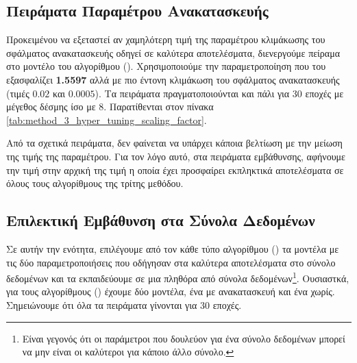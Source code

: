\subsection{Πειράματα Παραμέτρου Ανακατασκευής}

Προκειμένου να εξεταστεί αν χαμηλότερη τιμή της παραμέτρου κλιμάκωσης του σφάλματος ανακατασκευής οδηγεί σε καλύτερα αποτελέσματα, διενεργούμε πείραμα στο μοντέλο του αλγορίθμου (). Χρησιμοποιούμε την παραμετροποίηση που του εξασφαλίζει  \textbf{1.5597} αλλά με πιο έντονη κλιμάκωση του σφάλματος ανακατασκευής (τιμές $0.02$ και $0.0005$). Τα πειράματα πραγματοποιούνται και πάλι για 30 εποχές με μέγεθος δέσμης ίσο με 8. Παρατίθενται στον πίνακα \ref{tab:method_3_hyper_tuning_scaling_factor}.


\begin{table}[h]
    \begin{center}
    \end{center}
    \caption[]{\label{tab:method_3_hyper_tuning_scaling_factor}Αποτελέσματα πειραμάτων για την εύρεση της βέλτιστης τιμής του παράγοντα κλιμάκωσης του σφάλματος ανακατασκευής στο σύνολο δεδομένων . Τα πειράματα πραγματοποιήθηκαν για 30 εποχές με μέγεθος δέσμης ίσο με 8.} 
\end{table}

Από τα σχετικά πειράματα, δεν φαίνεται να υπάρχει κάποια βελτίωση με την μείωση της τιμής της παραμέτρου. Για τον λόγο αυτό, στα πειράματα εμβάθυνσης, αφήνουμε την τιμή στην αρχική της τιμή η οποία έχει προσφαίρει εκπληκτικά αποτελέσματα σε όλους τους αλγορίθμους της τρίτης μεθόδου.

\subsection{Επιλεκτική Εμβάθυνση στα Σύνολα Δεδομένων}
Σε αυτήν την ενότητα, επιλέγουμε από τον κάθε τύπο αλγορίθμου () τα μοντέλα με τις δύο παραμετροποιήσεις που οδήγησαν στα καλύτερα αποτελέσματα στο σύνολο δεδομένων  και τα εκπαιδεύουμε σε μια πληθόρα από σύνολα δεδομένων\footnote{Είναι γεγονός ότι οι παράμετροι που δουλεύον για ένα σύνολο δεδομένων μπορεί να μην είναι οι καλύτεροι για κάποιο άλλο σύνολο.}. Ουσιαστκά, για τους αλγορίθμους () έχουμε δύο μοντέλα, ένα με ανακατασκευή και ένα χωρίς. Σημειώνουμε ότι όλα τα πειράματα γίνονται για 30 εποχές.\par

